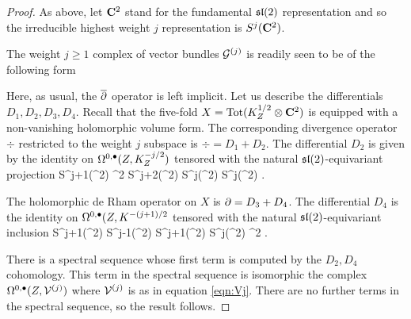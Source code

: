 \begin{proof}
As above, let $\mathbf{C}^2$ stand for the fundamental $\mathfrak{sl}(2)$ representation and so the irreducible highest weight $j$ representation is $S^j(\mathbf{C}^2)$.

The weight $j \geq 1$ complex of vector bundles $\mathcal G^{(j)}$ is readily seen to be of the following form
\beqn
{}
\eeqn

Here, as usual, the $\overline{\partial}$ operator is left implicit.
Let us describe the differentials $D_1,D_2,D_3,D_4$.
Recall that the five-fold $X = \text{Tot}(K_Z^{1/2} \otimes \mathbf{C}^2)$ is equipped with a non-vanishing holomorphic volume form. 
The corresponding divergence operator $\div$ restricted to the weight $j$ subspace is $\div = D_1 + D_2$. 
The differential $D_2$ is given by the identity on $\Omega^{0,\bullet}(Z, K^{-j/2}_Z)$ tensored with the natural $\mathfrak{sl}(2)$-equivariant projection
\beqn
S^{j+1}(\C^2) \otimes \C^2 \cong S^{j+2}(\C^2) \oplus S^{j}(\C^2) \twoheadrightarrow S^{j}(\C^2) .
\eeqn

The holomorphic de Rham operator on $X$ is $\partial = D_3+D_4$. 
The differential $D_4$ is the identity on $\Omega^{0,\bullet}(Z, K^{-(j+1)/2}$ tensored with the natural $\mathfrak{sl}(2)$-equivariant inclusion
\beqn
S^{j+1}(\C^2) \hookrightarrow S^{j-1}(\C^2) \oplus S^{j+1}(\C^2) \cong S^j(\C^2) \otimes \C^2 .
\eeqn

There is a spectral sequence whose first term is computed by the $D_2,D_4$ cohomology. 
This term in the spectral sequence is isomorphic the complex $\Omega^{0,\bullet}(Z, \mathcal V^{(j)})$ where $\mathcal V^{(j)}$ is as in equation \eqref{eqn:Vj}.
There are no further terms in the spectral sequence, so the result follows. 
\end{proof}

